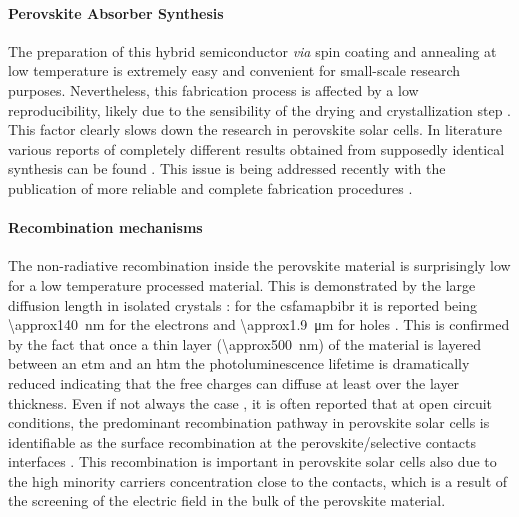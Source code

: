 	\paragraph{Perovskite Absorber Synthesis}
	The preparation of this hybrid semiconductor \textsl{via} spin coating and annealing at low temperature is extremely easy and convenient for small-scale research purposes.
	Nevertheless, this fabrication process is affected by a low reproducibility, likely due to the sensibility of the drying and crystallization step \cite{Pockett2015}.
	This factor clearly slows down the research in perovskite solar cells.
	In literature various reports of completely different results obtained from supposedly identical synthesis can be found \cite{Pockett2015,Gottesman2014}.
	This issue is being addressed recently with the publication of more reliable and complete fabrication procedures \cite{Saliba2018}.

	\paragraph{Recombination mechanisms}\label{intro_prv_recombination}
	The non-radiative recombination inside the perovskite material is surprisingly low for a low temperature processed material.
	This is demonstrated by the large diffusion length in isolated crystals \cite{Wehrenfennig2014,Wehrenfennig2014a,Stranks2013,Xing2013,Shi2015a,Eperon2014}: for the \gls{csfamapbibr} it is reported being \SI{\approx140}{\nm} for the electrons and \SI{\approx1.9}{\um} for holes \cite{Liu2017}.
	This is confirmed by the fact that once a thin layer (\SI{\approx500}{\nm}) of the material is layered between an \gls{etm} and an \gls{htm} the photoluminescence lifetime is dramatically reduced \cite{Jimenez-Lopez2017,Eperon2014} indicating that the free charges can diffuse at least over the layer thickness.
	Even if not always the case \cite{Valadez-Villalobos2019,Tress2018,Peng2016}, it is often reported that at open circuit conditions, the predominant recombination pathway in perovskite solar cells is identifiable as the surface recombination at the perovskite/\-selective contacts interfaces \cite{Calado2019,Stolterfoht2018a,Stolterfoht2018,Gelmetti2019,Shao2016,Correa-Baena2017,Hou2016}.
This recombination is important in perovskite solar cells also due to the high minority carriers concentration close to the contacts, which is a result of the screening of the electric field in the bulk of the perovskite material.

